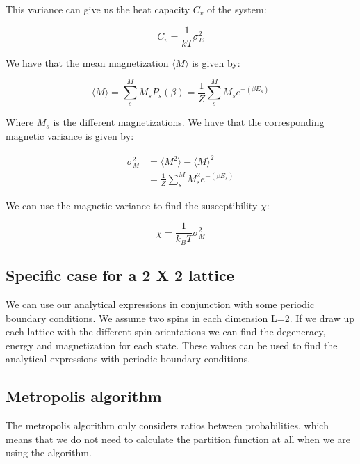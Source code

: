 \documentclass{article}
\begin{document}
\begin{multicols}{2}
This variance can give us the heat capacity $C_v$ of the system:

\begin{equation}
C_v = \frac{1}{kT} \sigma_E^2 
\label{eq:C_v}
\end{equation}

We have that the mean magnetization $\langle M \rangle$ is given by:

\begin{equation}
\langle M \rangle=\sum_s^M M_s P_s(\beta)=\frac{1}{Z}\sum_s^M M_s e^{-(\beta E_s)}
\label{eq:mM}
\end{equation}

Where $M_s$ is the different magnetizations. We have that the corresponding magnetic variance is given by:

\begin{equation}
\begin{split}
\sigma_M^2&=\langle M^2 \rangle-\langle M \rangle^2 \\
& = \frac{1}{Z}\sum_s^M M_s^2 e^{-(\beta E_s)}
\end{split}
\label{eq:M_v}
\end{equation}

We can use the magnetic variance to find the susceptibility $\chi$:

\begin{equation}
\chi = \frac{1}{k_BT}\sigma_M^2
\end{equation}

\subsection*{Specific case for a 2 X 2 lattice}

We can use our analytical expressions in conjunction with some periodic boundary conditions. We assume two spins in each dimension L=2. If we draw up each lattice with the different spin orientations we can find the degeneracy, energy and magnetization for each state. These values can be used to find the analytical expressions with periodic boundary conditions.

\subsection*{Metropolis algorithm}

The metropolis algorithm only considers ratios between probabilities, which means that we do not need to calculate the partition function at all when we are using the algorithm. 


\end{multicols}
\end{document}

